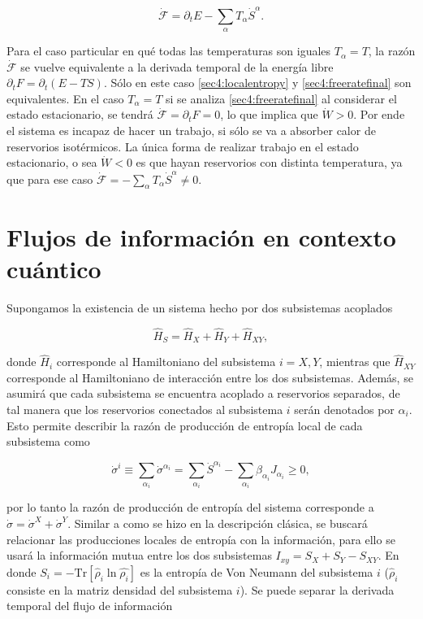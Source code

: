 \begin{equation*}
    \dot{\mathcal{F}} = \partial_{t}E - \sum_{\alpha}T_{\alpha} \dot{S}^{\alpha}.
\end{equation*}

Para el caso particular en qué todas las temperaturas son iguales $T_{\alpha} = T$, la razón $\dot{\mathcal{F}}$ se vuelve equivalente a la derivada temporal de la energía libre $\partial_{t}F = \partial_{t}(E-TS)$. Sólo en este caso \ref{sec4:localentropy} y \ref{sec4:freeratefinal} son equivalentes. En el caso $T_{\alpha}=T$ si se analiza \ref{sec4:freeratefinal} al considerar el estado estacionario, se tendrá $\dot{\mathcal{F}} = \partial_{t}F = 0$, lo que implica que $\dot{W}>0$. Por ende el sistema es incapaz de hacer un trabajo, si sólo se va a absorber calor de reservorios isotérmicos. La única forma de realizar trabajo en el estado estacionario, o sea $\dot{W}<0$ es que hayan reservorios con distinta temperatura, ya que para ese caso $\dot{\mathcal{F}} = - \sum_{\alpha} T_{\alpha} \dot{S}^{\alpha} \neq 0$.   

\section{Flujos de información en contexto cuántico}
Supongamos la existencia de un sistema hecho por dos subsistemas acoplados

\begin{equation*}
    \hat{H}_{S} = \hat{H}_{X} + \hat{H}_{Y} + \hat{H}_{XY}, 
\end{equation*}

donde $\hat{H}_{i}$ corresponde al Hamiltoniano del subsistema $i=X,Y$, mientras que $\hat{H}_{XY}$ corresponde al Hamiltoniano de interacción entre los dos subsistemas. Además, se asumirá que cada subsistema se encuentra acoplado a reservorios separados, de tal manera que los reservorios conectados al subsistema $i$ serán denotados por $\alpha_{i}$. Esto permite describir la razón de producción de entropía local de cada subsistema como

\begin{equation*}
    \dot{\sigma}^{i} \equiv \sum_{\alpha_{i}} \dot{\sigma}^{\alpha_{i}} = \sum_{\alpha_{i}} \dot{S}^{\alpha_{i}} - \sum_{\alpha_{i}} \beta_{\alpha_{i}} J_{\alpha_{i}} \geq 0,
\end{equation*}

por lo tanto la razón de producción de entropía del sistema corresponde a $\dot{\sigma} = \dot{\sigma}^{X} + \dot{\sigma}^{Y}$. Similar a como se hizo en la descripción clásica, se buscará relacionar las producciones locales de entropía con la información, para ello se usará la información mutua entre los dos subsistemas $I_{xy} = S_{X} + S_{Y} - S_{XY}$. En donde $S_{i} = - \text{Tr}[ \hat{\rho}_{i}\ln \hat{\rho_{i}}]$ es la entropía de Von Neumann del subsistema $i$ ($\hat{\rho}_{i}$ consiste en la matriz densidad del subsistema $i$). Se puede separar la derivada temporal del flujo de información

